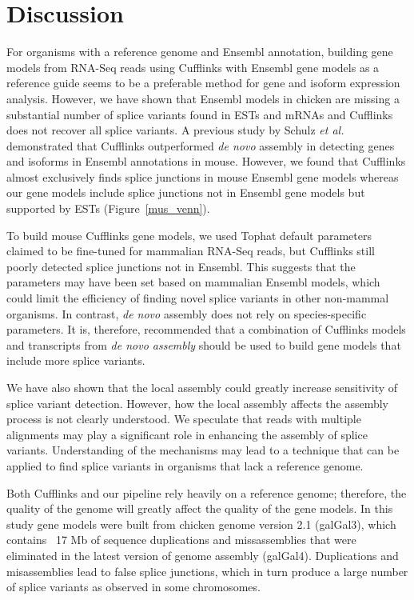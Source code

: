 \documentclass[10pt]{article}
\begin{document}
\section*{Discussion}

For organisms with a reference genome and Ensembl annotation, building gene
models from RNA-Seq reads using Cufflinks with Ensembl gene models as a
reference guide seems to be a preferable method for gene and isoform expression
analysis.  However, we have shown that Ensembl models in chicken are missing a
substantial number of splice variants found in ESTs and mRNAs and Cufflinks does
not recover all splice variants.  A previous study by Schulz \emph{et
al.}\cite{Schulz:2012je} demonstrated that Cufflinks outperformed \emph{de novo}
assembly in detecting genes and isoforms in Ensembl annotations in mouse.
However, we found that Cufflinks almost exclusively finds splice junctions in
mouse Ensembl gene models whereas our gene models include splice junctions not in
Ensembl gene models but supported by ESTs (Figure~\ref{mus_venn}). 

To build mouse Cufflinks gene models, we used Tophat default parameters claimed
to be fine-tuned for mammalian RNA-Seq reads, but Cufflinks still poorly
detected splice junctions not in Ensembl.  This suggests that the parameters may
have been set based on mammalian Ensembl models, which could limit the
efficiency of finding novel splice variants in other non-mammal organisms.  In
contrast, {\em de novo} assembly does not rely on species-specific parameters.
It is, therefore, recommended that a combination of Cufflinks models and
transcripts from {\em de novo assembly} should be used to build gene models that
include more splice variants.

We have also shown that the local assembly could greatly increase sensitivity
of splice variant detection. However, how the local assembly affects the
assembly process is not clearly understood.  We speculate that reads with
multiple alignments may play a significant role in enhancing the assembly of
splice variants.  Understanding of the mechanisms may lead to a technique that
can be applied to find splice variants in organisms that lack a reference
genome.

Both Cufflinks and our pipeline rely heavily on a reference genome; therefore,
the quality of the genome will greatly affect the quality of the gene models.
In this study gene models were built from chicken genome version 2.1 (galGal3),
which contains ~17 Mb of sequence duplications and missassemblies
that were eliminated in the latest version of genome assembly
(galGal4).  Duplications and misassemblies lead to false splice junctions, which
in turn produce a large number of splice variants as observed in some
chromosomes.
\end{document}
